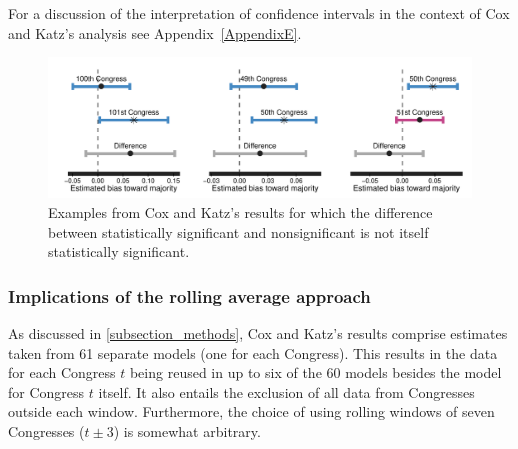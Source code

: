 For a discussion of the interpretation of confidence intervals in the context of Cox and Katz's analysis 
see Appendix~\ref{AppendixE}. 

\begin{figure}
\centering
\includegraphics[scale=0.75]{sections/figs/ck_signif_all}%
\caption{Examples from Cox and Katz's results for which the difference between statistically 
significant and nonsignificant is not itself statistically significant.}
\label{fig:ck_signif}
\end{figure}

\subsubsection{Implications of the rolling average approach}

As discussed in \ref{subsection_methods}, Cox and Katz's results comprise estimates taken 
from 61 separate models (one for each Congress). This results in the data for each Congress 
$t$ being reused in up to six of the 60 models besides the model for Congress $t$ itself. It also 
entails the exclusion of all data from Congresses outside each window. Furthermore, the 
choice of using rolling windows of seven Congresses ($t \pm 3$) is somewhat arbitrary. 

